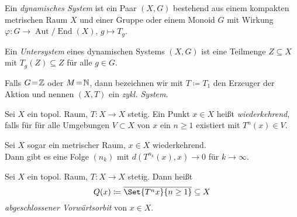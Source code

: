 \documentclass{cheat-sheet}
\DeclareMathOperator{\Aut}{Aut} %
\DeclareMathOperator{\End}{End} %
\newcommand{\AutEnd}{\Aut\!/\!\End} %
\newcommand{\clos}[1]{\overline{#1}} %
\begin{document}




\begin{defn}
  Ein \emph{dynamisches System} ist ein Paar $(X, G)$ bestehend aus einem kompakten metrischen Raum $X$ und einer Gruppe oder einem Monoid $G$ mit Wirkung
  $\varphi : G \to \AutEnd(X), \, g \mapsto T_g$.
\end{defn}

\begin{defn}
  Ein \emph{Untersystem} eines dynamischen Systems $(X, G)$ ist eine Teilmenge $Z \subseteq X$ mit $T_g(Z) \subseteq Z$ für alle $g \in G$.
\end{defn}

\begin{bem}
  Falls $G \!=\! \mathbb{Z}$ oder $M \!=\! \mathbb{N}$, dann bezeichnen wir mit $T \coloneqq T_1$ den Erzeuger der Aktion und nennen $(X, T)$ ein \emph{zykl. System}.
\end{bem}

\begin{defn}
  Sei $X$ ein topol. Raum, $T : X \to X$ stetig.
  Ein Punkt $x \in X$ heißt \emph{wiederkehrend}, falls für für alle Umgebungen $V \subset X$ von $x$ ein $n \geq 1$ existiert mit $T^n(x) \in V$.
\end{defn}

\begin{bem}
  Sei $X$ sogar ein metrischer Raum, $x \in X$ wiederkehrend. \\
  Dann gibt es eine Folge $(n_k)$ mit $d(T^{n_k}(x), x) \to 0$ für $k \to \infty$.
\end{bem}

\begin{defn}
  Sei $X$ ein topol. Raum, $T : X \to X$ stetig. Dann heißt
  \[ Q(x) \coloneqq \clos{\Set{T^n x}{n \geq 1}} \subseteq X \]
  \emph{abgeschlossener Vorwärtsorbit} von $x \in X$.
\end{defn}
\end{document}
